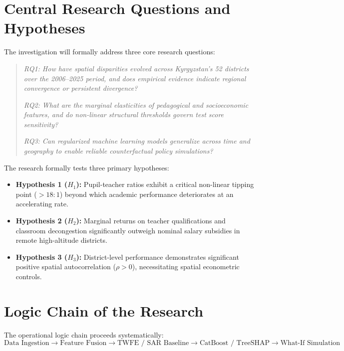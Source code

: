 \documentclass[12pt,letterpaper]{report}
\begin{document}
\section{Central Research Questions and Hypotheses}
The investigation will formally address three core research questions:
\begin{quote}
\textit{RQ1: How have spatial disparities evolved across Kyrgyzstan's 52 districts over the 2006--2025 period, and does empirical evidence indicate regional convergence or persistent divergence?}

\textit{RQ2: What are the marginal elasticities of pedagogical and socioeconomic features, and do non-linear structural thresholds govern test score sensitivity?}

\textit{RQ3: Can regularized machine learning models generalize across time and geography to enable reliable counterfactual policy simulations?}
\end{quote}

The research formally tests three primary hypotheses:
\begin{itemize}[noitemsep,topsep=2pt,parsep=0pt]
    \item \textbf{Hypothesis 1 ($H_1$):} Pupil-teacher ratios exhibit a critical non-linear tipping point ($>18:1$) beyond which academic performance deteriorates at an accelerating rate.
    \item \textbf{Hypothesis 2 ($H_2$):} Marginal returns on teacher qualifications and classroom decongestion significantly outweigh nominal salary subsidies in remote high-altitude districts.
    \item \textbf{Hypothesis 3 ($H_3$):} District-level performance demonstrates significant positive spatial autocorrelation ($\rho > 0$), necessitating spatial econometric controls.
\end{itemize}

\section{Logic Chain of the Research}
The operational logic chain proceeds systematically:
\begin{equation*}
    \text{Data Ingestion} \longrightarrow \text{Feature Fusion} \longrightarrow \text{TWFE / SAR Baseline} \longrightarrow \text{CatBoost / TreeSHAP} \longrightarrow \text{What-If Simulation}
\end{equation*}


\end{document}

